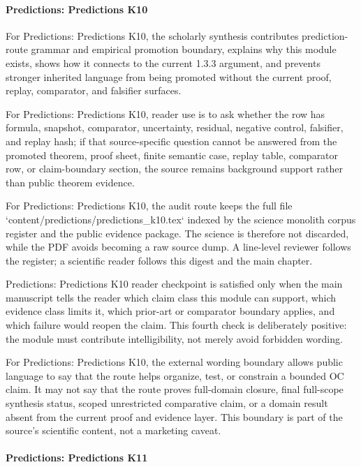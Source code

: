 \paragraph{Predictions: Predictions K10}

For Predictions: Predictions K10, the scholarly synthesis contributes prediction-route grammar and empirical promotion boundary, explains why this module exists, shows how it connects to the current 1.3.3 argument, and prevents stronger inherited language from being promoted without the current proof, replay, comparator, and falsifier surfaces.


For Predictions: Predictions K10, reader use is to ask whether the row has formula, snapshot, comparator, uncertainty, residual, negative control, falsifier, and replay hash; if that source-specific question cannot be answered from the promoted theorem, proof sheet, finite semantic case, replay table, comparator row, or claim-boundary section, the source remains background support rather than public theorem evidence.


For Predictions: Predictions K10, the audit route keeps the full file `content/predictions/predictions\_k10.tex` indexed by the science monolith corpus register and the public evidence package. The science is therefore not discarded, while the PDF avoids becoming a raw source dump. A line-level reviewer follows the register; a scientific reader follows this digest and the main chapter.


Predictions: Predictions K10 reader checkpoint is satisfied only when the main manuscript tells the reader which claim class this module can support, which evidence class limits it, which prior-art or comparator boundary applies, and which failure would reopen the claim. This fourth check is deliberately positive: the module must contribute intelligibility, not merely avoid forbidden wording.


For Predictions: Predictions K10, the external wording boundary allows public language to say that the route helps organize, test, or constrain a bounded OC claim. It may not say that the route proves full-domain closure, final full-scope synthesis status, scoped unrestricted comparative claim, or a domain result absent from the current proof and evidence layer. This boundary is part of the source's scientific content, not a marketing caveat.


\paragraph{Predictions: Predictions K11}

